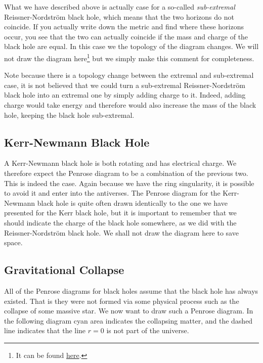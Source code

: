 What we have described above is actually case for a so-called \textit{sub-extremal} Reissner-Nordstr\"{o}m black hole, which means that the two horizons do not coincide. If you actually write down the metric and find where these horizons occur, you see that the two can actually coincide if the mass and charge of the black hole are equal. In this case we the topology of the diagram changes. We will not draw the diagram here\footnote{It can be found \href{https://jila.colorado.edu/~ajsh/insidebh/penrose.html}{here}.} but we simply make this comment for completeness. 

\br 
    Note because there is a topology change between the extremal and sub-extremal case, it is not believed that we could turn a sub-extremal Reissner-Nordstr\"{o}m black hole into an extremal one by simply adding charge to it. Indeed, adding charge would take energy and therefore would also increase the mass of the black hole, keeping the black hole sub-extremal. 
\er 

\subsection{Kerr-Newmann Black Hole}

A Kerr-Newmann black hole is both rotating and has electrical charge. We therefore expect the Penrose diagram to be a combination of the previous two. This is indeed the case. Again because we have the ring singularity, it is possible to avoid it and enter into the antiverses. The Penrose diagram for the Kerr-Newmann black hole is quite often drawn identically to the one we have presented for the Kerr black hole, but it is important to remember that we should indicate the charge of the black hole somewhere, as we did with the Reissner-Nordstr\"{o}m black hole. We shall not draw the diagram here to save space. 

\subsection{Gravitational Collapse}

All of the Penrose diagrams for black holes assume that the black hole has always existed. That is they were not formed via some physical process such as the collapse of some massive star. We now want to draw such a Penrose diagram. In the following diagram cyan area indicates the collapsing matter, and the dashed line indicates that the line $r=0$ is not part of the universe.

